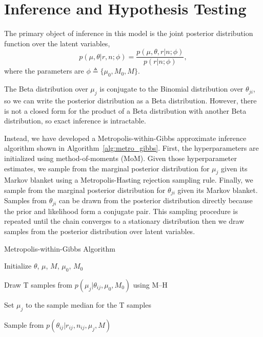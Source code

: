 \documentclass{bioinfo}
\begin{document}
\section{Inference and Hypothesis Testing}

The primary object of inference in this model is the joint posterior distribution function over the latent variables,
\begin{equation}
	p(\mu, \theta | r, n; \phi)  = \frac{ p(\mu, \theta, r | n; \phi) } {p ( r | n; \phi)},
\end{equation}
where the parameters are $\phi \triangleq \{\mu_0, M_0, M\}$.

The Beta distribution over $\mu_j$ is conjugate to the Binomial distribution over $\theta_{ji}$, so we can write the posterior distribution as a Beta distribution. However, there is not a closed form for the product of a Beta distribution with another Beta distribution, so exact inference is intractable.

Instead, we have developed a Metropolis-within-Gibbs  approximate inference algorithm shown in Algorithm~\ref{alg:metro_gibbs}. First, the hyperparameters are initialized using method-of-moments (MoM). Given those hyperparameter estimates, we sample from the marginal posterior distribution for $\mu_j$ given its Markov blanket using a Metropolis-Hasting rejection sampling rule. Finally, we sample from the marginal posterior distribution for $\theta_{ji}$ given its Markov blanket. Samples from $\theta_{ji}$ can be drawn from the posterior distribution directly  because the prior and likelihood form a conjugate pair. This sampling procedure is repeated until the chain converges to a stationary distribution then we draw samples from the posterior distribution over latent variables.

\begin{algorithm}[ht]
  \caption{Metropolis-within-Gibbs Algorithm}
  \label{alg:metro_gibbs}
  \begin{algorithmic}[1]

  \State Initialize $\theta$, $\mu$, $M$, $\mu_0$, $M_0$

  \Repeat


    \State Draw T samples from $p \left( \mu_j |\theta_{ij},\mu_0,M_0\right)$ using M--H 

    \State Set $\mu_j$ to the sample median for the T samples


	\State Sample from $p \left( \theta_{ij} |r_{ij},n_{ij},\mu_j,M \right)$
	
      \EndFor

    \EndFor


  \end{algorithmic}
\end{algorithm}
\end{document}
